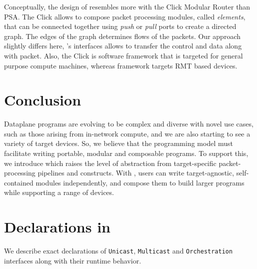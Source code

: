 \documentclass[letterpaper,twocolumn,10pt]{article}
\begin{document}
Conceptually, the design of \uarch resembles more with the Click 
Modular Router\cite{Kohler:2000:CMR:354871.354874} than PSA. The 
Click allows to compose packet processing modules, called 
\emph{elements}, that can be connected together using \emph{push} or 
\emph{pull} ports to create a directed graph. The edges of the 
graph determines flows of the packets. Our approach slightly differs 
here, \uarch's interfaces allows to transfer the control and data 
along with packet. Also, the Click is software framework that is 
targeted for general purpose compute machines, whereas \ulang 
framework targets RMT based devices.


\section{Conclusion}
Dataplane programs are evolving to be complex and diverse with novel
use cases, such as those arising from in-network compute, and we are
also starting to see a variety of target devices. So, we believe that
the programming model must facilitate writing portable, modular and
composable programs. To support this, we introduce \ulang which raises
the level of abstraction from target-specific packet-processing
pipelines and constructs. With \ulang, users can write
target-agnostic, self-contained modules independently, and compose
them to build larger programs while supporting a range of devices.



\clearpage




\appendix
\section{Declarations in \uarch}
\label{appendix:section:micro-switch-architecture}
We describe exact declarations of \texttt{Unicast}, 
\texttt{Multicast} and \texttt{Orchestration} interfaces along with 
their runtime behavior. 
\end{document}
